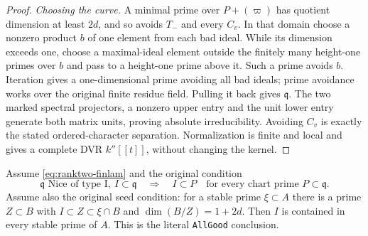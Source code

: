 \begin{proof}
\emph{Choosing the curve.}
A minimal prime over $P+(\varpi)$ has quotient dimension at least
$2d$, and so avoids $T_-$ and every $C_v$.  In that domain choose
a nonzero product $b$ of one element from each bad ideal.
While its dimension exceeds one, choose a maximal-ideal element
outside the finitely many height-one primes over $b$ and pass to a
height-one prime above it.  Such a prime avoids $b$.  Iteration gives
a one-dimensional prime avoiding all bad ideals; prime avoidance
works over the original finite residue field.  Pulling it back gives
$\mathfrak q$.  The two marked spectral projectors, a nonzero upper
entry and the unit lower entry generate both matrix units, proving
absolute irreducibility.  Avoiding $C_v$ is exactly the stated
ordered-character separation.  Normalization is finite and local
and gives a complete DVR $k''[[t]]$, without changing the kernel.
\end{proof}

\begin{theorem}
\label{thm:ranktwo-allgood}
Assume \eqref{eq:ranktwo-finlam} and the original condition
\[
 \mathfrak q\text{ Nice of type I},\ I\subset\mathfrak q
       \quad\Longrightarrow\quad
 I\subset P\quad\text{for every chart prime }P\subset\mathfrak q.
                                                               \tag{$P1'$}
\]
Assume also the original seed condition: for a stable prime
$\xi\subset A$ there is a prime $Z\subset B$ with
$I\subset Z\subset\xi\cap B$ and $\dim(B/Z)=1+2d$.
Then $I$ is contained in every stable prime of $A$.
This is the literal \texttt{AllGood} conclusion.
\end{theorem}

